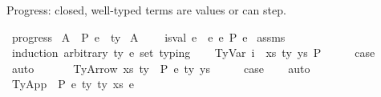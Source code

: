 \begin{isabellebody}
%
\begin{isamarkuptext}%
Progress: closed, well-typed terms are values or can step.%
\end{isamarkuptext}\isamarkuptrue%
\isamarkupfalse%
\ progress{\isacharcolon}{\kern0pt}\isanewline
{}\ A{}{\isacharcolon}{\kern0pt}\ {\isachardoublequoteopen}{\isasymGamma}\ {\isasymturnstile}{\isacharbraceleft}{\kern0pt}P{\isacharbraceright}{\kern0pt}\ e\ {\isacharcolon}{\kern0pt}\ ty{\isachardoublequoteclose}\isanewline
{}\ A{}{\isacharcolon}{\kern0pt}\ {\isachardoublequoteopen}{\isasymGamma}\ {\isacharequal}{\kern0pt}\ {\isacharbrackleft}{\kern0pt}{\isacharbrackright}{\kern0pt}{\isachardoublequoteclose}\isanewline
{}\ {\isachardoublequoteopen}is{\isacharunderscore}{\kern0pt}val\ e\ {\isasymor}\ {\isacharparenleft}{\kern0pt}{\isasymexists}e{\isacharprime}{\kern0pt}{\isachardot}{\kern0pt}\ e\ {\isacharminus}{\kern0pt}{\isachargreater}{\kern0pt}{\isacharbraceleft}{\kern0pt}P{\isacharbraceright}{\kern0pt}\ e{\isacharprime}{\kern0pt}{\isacharparenright}{\kern0pt}{\isachardoublequoteclose}\isanewline
%
\isadelimproof
%
\endisadelimproof
%
\isatagproof
{}\isamarkupfalse%
\ assms\isanewline
{}\isamarkupfalse%
\ {\isacharparenleft}{\kern0pt}induction\ arbitrary{\isacharcolon}{\kern0pt}\ ty\ e{\isacharprime}{\kern0pt}\ set{\isacharcolon}{\kern0pt}\ typing{\isacharparenright}{\kern0pt}\isanewline
\ \ \isamarkupfalse%
\ {\isacharparenleft}{\kern0pt}TyVar\ i\ {\isasymGamma}\ xs\ ty\ ys\ P{\isacharparenright}{\kern0pt}\isanewline
\ \ \isamarkupfalse%
\ \isamarkupfalse%
\ {\isacharquery}{\kern0pt}case\isanewline
\ \ \isamarkupfalse%
\ auto\isanewline
\ \ \isamarkupfalse%
\isanewline
{}\isamarkupfalse%
\isanewline
\ \ \isamarkupfalse%
\ {\isacharparenleft}{\kern0pt}TyArrow\ xs\ ty{}\ {\isasymGamma}\ P\ e\ ty{}\ ys{\isacharparenright}{\kern0pt}\isanewline
\ \ \isamarkupfalse%
\ \isamarkupfalse%
\ {\isacharquery}{\kern0pt}case\isanewline
\ \ \isamarkupfalse%
\ auto\isanewline
\ \ \isamarkupfalse%
\isanewline
{}\isamarkupfalse%
\isanewline
\ \ \isamarkupfalse%
\ {\isacharparenleft}{\kern0pt}TyApp\ {\isasymGamma}\ P\ e{}\ ty{}\ ty{}\ xs\ e{}{\isacharparenright}{\kern0pt}\isanewline

\end{isabellebody}
